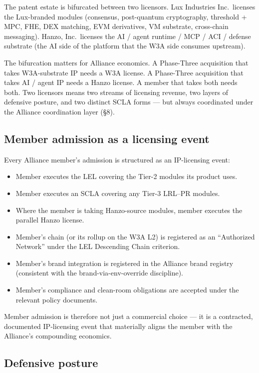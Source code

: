 The patent estate is bifurcated between two licensors. Lux Industries
Inc.\ licenses the Lux-branded modules (consensus, post-quantum
cryptography, threshold + MPC, FHE, DEX matching, EVM derivatives, VM
substrate, cross-chain messaging). Hanzo, Inc.\ licenses the AI / agent
runtime / MCP / ACI / defense substrate (the AI side of the platform
that the W3A side consumes upstream).

The bifurcation matters for Alliance economics. A Phase-Three
acquisition that takes W3A-substrate IP needs a W3A license. A
Phase-Three acquisition that takes AI / agent IP needs a Hanzo license.
A member that takes both needs both. Two licensors means two streams of
licensing revenue, two layers of defensive posture, and two distinct
SCLA forms --- but always coordinated under the Alliance coordination
layer (\S 8).

\subsection{Member admission as a licensing event}

Every Alliance member's admission is structured as an IP-licensing event:

\begin{itemize}[leftmargin=2em,itemsep=0.1em]
\item Member executes the LEL covering the Tier-2 modules its product
uses.
\item Member executes an SCLA covering any Tier-3 LRL--PR modules.
\item Where the member is taking Hanzo-source modules, member executes
the parallel Hanzo license.
\item Member's chain (or its rollup on the W3A L2) is registered as an
``Authorized Network'' under the LEL Descending Chain criterion.
\item Member's brand integration is registered in the Alliance brand
registry (consistent with the brand-via-env-override discipline).
\item Member's compliance and clean-room obligations are accepted under
the relevant policy documents.
\end{itemize}

Member admission is therefore not just a commercial choice --- it is a
contracted, documented IP-licensing event that materially aligns the
member with the Alliance's compounding economics.

\subsection{Defensive posture}


